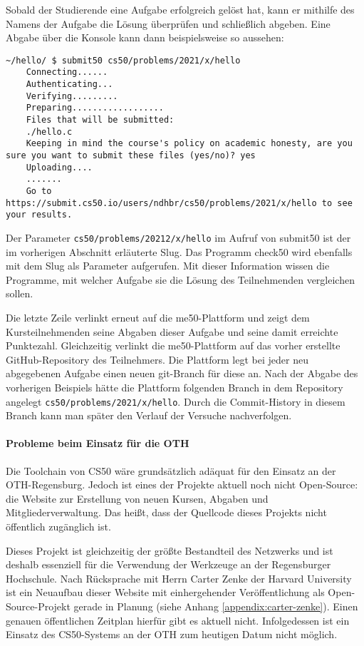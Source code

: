 Sobald der Studierende eine Aufgabe erfolgreich gelöst hat, kann er mithilfe des
Namens der Aufgabe die Lösung überprüfen und schließlich abgeben. Eine Abgabe
über die Konsole kann dann beispielsweise so aussehen:

\begin{lstlisting}[style=Bash]
    ~/hello/ $ submit50 cs50/problems/2021/x/hello
    Connecting......
    Authenticating...
    Verifying.........
    Preparing..................
    Files that will be submitted:
    ./hello.c
    Keeping in mind the course's policy on academic honesty, are you sure you want to submit these files (yes/no)? yes
    Uploading....
    .......
    Go to https://submit.cs50.io/users/ndhbr/cs50/problems/2021/x/hello to see your results.
\end{lstlisting}

Der Parameter \texttt{cs50/problems/20212/x/hello} im Aufruf von submit50 ist
der im vorherigen Abschnitt erläuterte Slug. Das Programm check50 wird ebenfalls
mit dem Slug als Parameter aufgerufen. Mit dieser Information wissen die
Programme, mit welcher Aufgabe sie die Lösung des Teilnehmenden vergleichen
sollen.

Die letzte Zeile verlinkt erneut auf die me50-Plattform und zeigt dem
Kursteilnehmenden seine Abgaben dieser Aufgabe und seine damit erreichte
Punktezahl. Gleichzeitig verlinkt die me50-Plattform auf das vorher erstellte
GitHub-Repository des Teilnehmers. Die Plattform legt bei jeder neu abgegebenen
Aufgabe einen neuen git-Branch für diese an. Nach der Abgabe des vorherigen
Beispiels hätte die Plattform folgenden Branch in dem Repository angelegt
\texttt{cs50/problems/2021/x/hello}. Durch die Commit-History in diesem Branch 
kann man später den Verlauf der Versuche nachverfolgen.

\paragraph{Probleme beim Einsatz für die OTH}
Die Toolchain von CS50 wäre grundsätzlich adäquat für den Einsatz an der
OTH-Regensburg. Jedoch ist eines der Projekte aktuell noch nicht Open-Source:
die Website zur Erstellung von neuen Kursen, Abgaben und Mitgliederverwaltung. 
Das heißt, dass der Quellcode dieses Projekts nicht öffentlich zugänglich ist.

Dieses Projekt ist gleichzeitig der größte Bestandteil des Netzwerks und ist
deshalb essenziell für die Verwendung der Werkzeuge an der Regensburger
Hochschule. Nach Rücksprache mit Herrn Carter Zenke der Harvard University ist
ein Neuaufbau dieser Website mit einhergehender Veröffentlichung als
Open-Source-Projekt gerade in Planung (siehe Anhang
\ref{appendix:carter-zenke}). Einen genauen öffentlichen Zeitplan hierfür gibt
es aktuell nicht. Infolgedessen ist ein Einsatz des CS50-Systems an der OTH zum
heutigen Datum nicht möglich.

